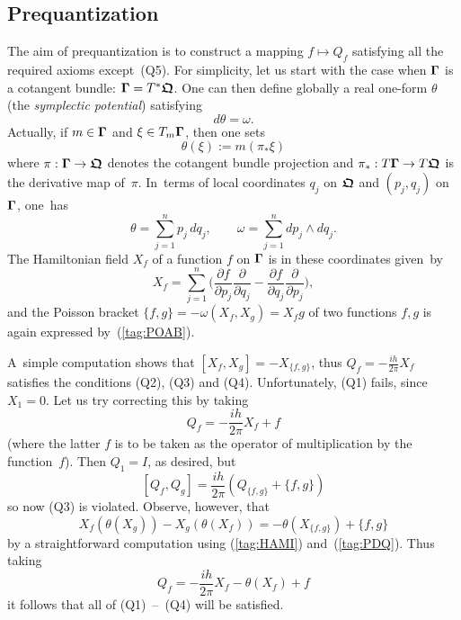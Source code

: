 \documentclass[11pt]{amsart}
\numberwithin{equation}{section}
\theoremstyle{remark}
\newcommand\Omg{{\bigam}}   %
\newcommand{\bigam}{\mbox{\boldmath $\Gamma$}}
\newcommand{\bfrakQ}{\mbox{\boldmath $\mathfrak Q$}}
\begin{document}
\subsection{Prequantization} \label{sec21}
The aim of prequantization is to construct a mapping $f\mapsto Q_f$ satisfying
all the required axioms except~(Q5). For simplicity, let us start with the case
when $\Omg$ is a cotangent bundle: $\Omg=T^*\bfrakQ$. One can then define
globally a real one-form $\theta$ (the {\sl symplectic potential\/}) satisfying
\begin{equation}  d\theta=\omega.  \label{tag:SYMPOT}  \end{equation}
Actually, if $m\in \Omg$ and $\xi\in T_m\Omg$, then one sets
$$ \theta(\xi):= m(\pi_*\xi)  $$
where $\pi:\Omg\to\bfrakQ$ denotes the cotangent bundle projection and
$\pi_*:T\Omg\to T\bfrakQ$ is the derivative map of~$\pi$. In~terms of local
coordinates $q_j$ on $\bfrakQ$ and $(p_j,q_j)$ on~$\Omg$, one~has
\begin{equation}  \theta=\sum_{j=1}^n p_j\,dq_j, \qquad
\omega=\sum_{j=1}^n dp_j\wedge dq_j.  \label{tag:PDQ}  \end{equation}
The Hamiltonian field $X_f$ of a function $f$ on $\Omg$ is in these coordinates
given~by
\begin{equation}  X_f = \sum_{j=1}^n \Big( \frac{\partial f}{\partial p_j}
\frac{\partial}{\partial q_j} - \frac{\partial f}{\partial q_j}
\frac{\partial}{\partial p_j} \Big),   \label{tag:HAMI}  \end{equation}
and the Poisson bracket $\{f,g\}=- \omega(X_f,X_g)=X_f g$ of two functions
$f,g$ is again expressed by~(\ref{tag:POAB}).

A~simple computation shows that $[X_f,X_g]= - X_{\{f,g\}}$, thus
$Q_f=-\frac{ih}{2\pi} X_f$ satisfies the conditions (Q2), (Q3) and (Q4).
Unfortunately, (Q1) fails, since $X_1=0$. Let us try correcting this by taking
$$ Q_f = -\frac{ih}{2\pi} X_f +f  $$
(where the latter $f$ is to be taken as the operator of multiplication by the
function~$f$). Then $Q_1=I$, as desired, but
$$ [Q_f,Q_g] = \frac{ih}{2\pi} (Q_{\{f,g\}} + \{f,g\})  $$
so now (Q3) is violated. Observe, however, that
$$ X_f(\theta(X_g))-X_g(\theta(X_f)) = - \theta(X_{\{f,g\}})+\{f,g\}  $$
by a straightforward computation using (\ref{tag:HAMI}) and~(\ref{tag:PDQ}).
Thus taking
\begin{equation}  Q_f = -\frac{ih}{2\pi} X_f - \theta(X_f) + f
\label{tag:QFA}  \end{equation}
it follows that all of (Q1)~--~(Q4) will be satisfied.
\end{document}
